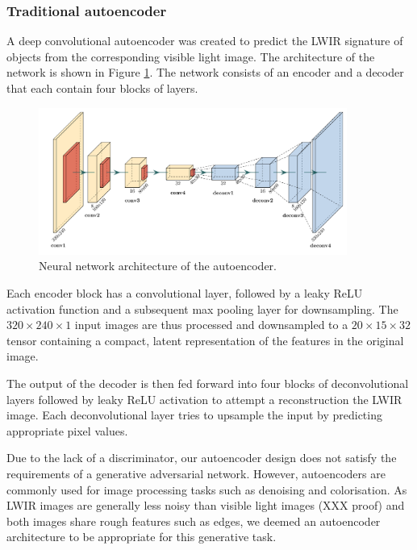 \documentclass{l4proj}
\begin{document}
\subsubsection{Traditional autoencoder}

A deep convolutional autoencoder was created to predict the LWIR signature of objects from the corresponding visible light image. The architecture of the network is shown in Figure \ref{fig:autoencoder_architecture}. The network consists of an encoder and a decoder that each contain four blocks of layers.

\begin{figure}[ht]
  \centering
  \includegraphics[width=0.9\textwidth]{images/models/autoencoder}
  \caption{Neural network architecture of the autoencoder.}
  \label{fig:autoencoder_architecture}
\end{figure}

Each encoder block has a convolutional layer, followed by a leaky ReLU activation function and a subsequent max pooling layer for downsampling. The $320 \times 240 \times 1$ input images are thus processed and downsampled to a $20 \times 15 \times 32$ tensor containing a compact, latent representation of the features in the original image.

The output of the decoder is then fed forward into four blocks of deconvolutional layers followed by leaky ReLU activation to attempt a reconstruction the LWIR image. Each deconvolutional layer tries to upsample the input by predicting appropriate pixel values.

Due to the lack of a discriminator, our autoencoder design does not satisfy the requirements of a generative adversarial network. However, autoencoders are commonly used for image processing tasks such as denoising and colorisation. As LWIR images are generally less noisy than visible light images (XXX proof) and both images share rough features such as edges, we deemed an autoencoder architecture to be appropriate for this generative task.
\end{document}

